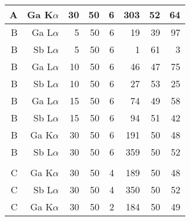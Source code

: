 \begin{table}[phtb]
\begin{center}
\begin{tabular}{rrrrrrrr}
            A               & Ga K$\alpha$       & 30             & 50             & 6           & 303               & 52                   & 64                        \\
            \hline
            B               & Ga L$\alpha$       & 5              & 50             & 6           & 19                & 39                   & 97                        \\
            B               & Sb L$\alpha$       & 5              & 50             & 6           & 1                 & 61                   & 3                         \\
            B               & Ga L$\alpha$       & 10             & 50             & 6           & 46                & 47                   & 75                        \\
            B               & Sb L$\alpha$       & 10             & 50             & 6           & 27                & 53                   & 25                        \\
            B               & Ga L$\alpha$       & 15             & 50             & 6           & 74                & 49                   & 58                        \\
            B               & Sb L$\alpha$       & 15             & 50             & 6           & 94                & 51                   & 42                        \\
            B               & Ga K$\alpha$       & 30             & 50             & 6           & 191               & 50                   & 48                        \\
            B               & Sb L$\alpha$       & 30             & 50             & 6           & 359               & 50                   & 52                        \\
            \hline          &                    &                &                &             &                   &                      &                           \\
            C               & Ga K$\alpha$       & 30             & 50             & 4           & 189               & 50                   & 48                        \\
            C               & Sb L$\alpha$       & 30             & 50             & 4           & 350               & 50                   & 52                        \\
            C               & Ga K$\alpha$       & 30             & 50             & 2           & 184               & 50                   & 49                        \\

\end{tabular}
\end{center}
\end{table}
